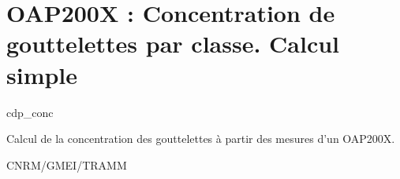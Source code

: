 %
\section{OAP200X : Concentration de gouttelettes par classe. Calcul simple}

 {\sf cdp\_conc}

Calcul de la concentration des gouttelettes \`a partir 
des mesures d'un OAP200X.

\bigskip





CNRM/GMEI/TRAMM

